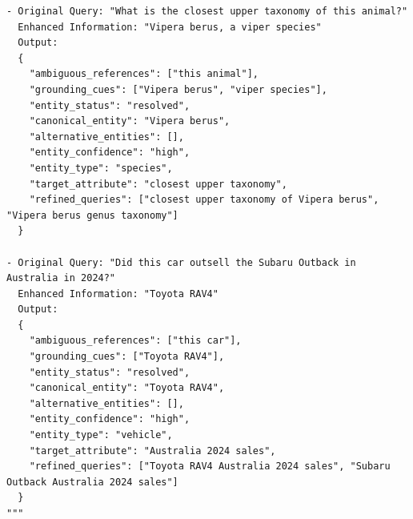 \begin{verbatim}
- Original Query: "What is the closest upper taxonomy of this animal?"
  Enhanced Information: "Vipera berus, a viper species"
  Output:
  {
    "ambiguous_references": ["this animal"],
    "grounding_cues": ["Vipera berus", "viper species"],
    "entity_status": "resolved",
    "canonical_entity": "Vipera berus",
    "alternative_entities": [],
    "entity_confidence": "high",
    "entity_type": "species",
    "target_attribute": "closest upper taxonomy",
    "refined_queries": ["closest upper taxonomy of Vipera berus", "Vipera berus genus taxonomy"]
  }

- Original Query: "Did this car outsell the Subaru Outback in Australia in 2024?"
  Enhanced Information: "Toyota RAV4"
  Output:
  {
    "ambiguous_references": ["this car"],
    "grounding_cues": ["Toyota RAV4"],
    "entity_status": "resolved",
    "canonical_entity": "Toyota RAV4",
    "alternative_entities": [],
    "entity_confidence": "high",
    "entity_type": "vehicle",
    "target_attribute": "Australia 2024 sales",
    "refined_queries": ["Toyota RAV4 Australia 2024 sales", "Subaru Outback Australia 2024 sales"]
  }
"""
\end{verbatim}

